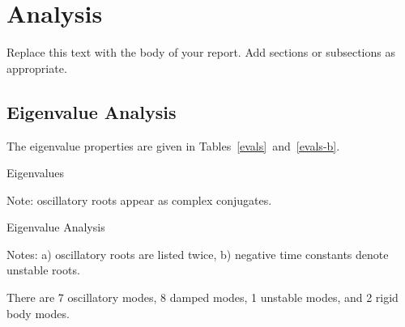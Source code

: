 \chapter{Analysis}
Replace this text with the body of your report.  Add sections or subsections as appropriate.
\section{Eigenvalue Analysis}
The eigenvalue properties are given in Tables~\ref{evals}~and~\ref{evals-b}.

\begin{table}[ht]
\begin{center}
\begin{threeparttable}
\begin{footnotesize}
\caption{Eigenvalues}
\label{evals}
\begin{tablenotes}
\item Note: oscillatory roots appear as complex conjugates.
\end{tablenotes}
\end{footnotesize}
\end{threeparttable}
\end{center}
\end{table}
\begin{table}[ht]
\begin{center}
\begin{threeparttable}
\begin{footnotesize}
\caption{Eigenvalue Analysis}
\label{evals-b}
\begin{tablenotes}
\item Notes: a) oscillatory roots are listed twice, b) negative time constants denote unstable roots.
\end{tablenotes}
\end{footnotesize}
\end{threeparttable}
\end{center}
\end{table}
There are 7 oscillatory modes, 8 damped modes, 1 unstable modes, and 2 rigid body modes.
\pagebreak
